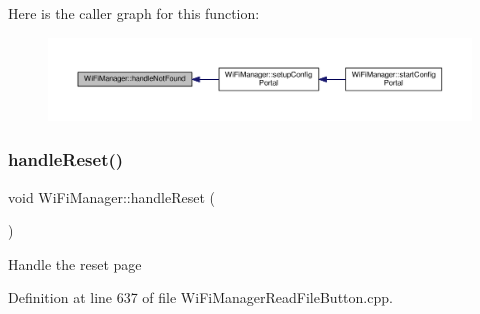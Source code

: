 Here is the caller graph for this function\+:
\nopagebreak
\begin{figure}[H]
\begin{center}
\leavevmode
\includegraphics[width=350pt]{d4/dc8/class_wi_fi_manager_a7d01f7de3e4b76acdabffac79fa3d0ab_icgraph}
\end{center}
\end{figure}
\mbox{\label{class_wi_fi_manager_a94fb1a8fcfbd0d02714c69138bf72f9c}} 
\subsubsection{\texorpdfstring{handle\+Reset()}{handleReset()}}
{\footnotesize\ttfamily void Wi\+Fi\+Manager\+::handle\+Reset (\begin{DoxyParamCaption}{ }\end{DoxyParamCaption})\hspace{0.3cm}{\ttfamily [private]}}

Handle the reset page 

Definition at line 637 of file Wi\+Fi\+Manager\+Read\+File\+Button.\+cpp.


